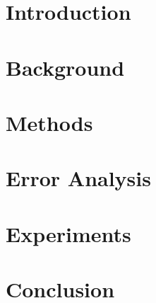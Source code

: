 



\section{Introduction}\label{ndossec:int}
	

\section{Background}\label{ndossec:bac}
	

\section{Methods}\label{ndossec:met}
	

\section{Error Analysis}\label{ndossec:err}
	

\section{Experiments}\label{ndossec:exp}
	

\section{Conclusion}\label{ndossec:con}
	